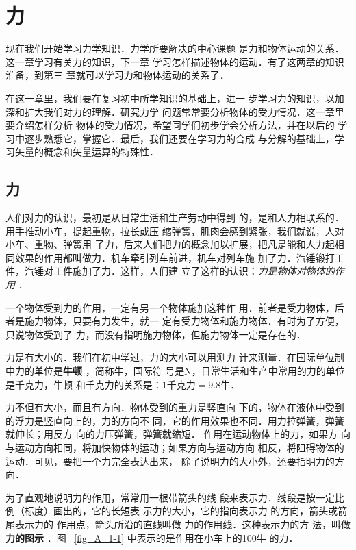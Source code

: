 \chapter{力}\label{chapter-force}

    现在我们开始学习力学知识．力学所要解决的中心课题
是力和物体运动的关系．这一章学习有关力的知识，下一章
学习怎样描述物体的运动．有了这两章的知识淮备，到第三
章就可以学习力和物体运动的关系了．

    在这一章里，我们要在复习初中所学知识的基础上，进一
步学习力的知识，以加深和扩大我们对力的理解．研究力学
问题常常要分析物体的受力情况．这一章里要介绍怎样分析
物体的受力情况，希望同学们初步学会分析方法，并在以后的
学习中逐步熟悉它，掌握它．最后，我们还要在学习力的合成
与分解的基础上，学习矢量的概念和矢量运算的特殊性．


\section{力} 
    人们对力的认识，最初是从日常生活和生产劳动中得到
的，是和人力相联系的．用手推动小车，提起重物，拉长或压
缩弹簧，肌肉会感到紧张，我们就说，人对小车、重物、弹簧用
了力，后来人们把力的概念加以扩展，把凡是能和人力起相
同效果的作用都叫做力．机车牵引列车前进，机车对列车施
加了力．汽锤锻打工件，汽锤对工件施加了力．这样，人们建
立了这样的认识：\textit{力是物体对物体的作用} ．

一个物体受到力的作用，一定有另一个物体施加这种作
用．前者是受力物体，后者是施力物体，只要有力发生，就一
定有受力物体和施力物体．有时为了方便，只说物体受到了
力，而没有指明施力物体，但施力物体一定是存在的．

    力是有大小的．我们在初中学过，力的大小可以用测力
计来测量．在国际单位制中力的单位是\textbf{牛顿} ，简称牛，国际符
号是N，日常生活和生产中常用的力的单位是千克力，牛顿
和千克力的关系是：1千克力$=9.8$牛．

    力不但有大小，而且有方向．物体受到的重力是竖直向
下的，物体在液体中受到的浮力是竖直向上的，力的方向不
同，它的作用效果也不同．用力拉弹簧，弹簧就伸长；用反方
向的力压弹簧，弹簧就缩短．
作用在运动物体上的力，如果方
向与运动方向相同，将加快物体的运动；如果方向与运动方向
相反，将阻碍物体的运动．可见，要把一个力完全表达出来，
除了说明力的大小外，还要指明力的方向．

为了直观地说明力的作用，常常用一根带箭头的线
段来表示力．线段是按一定比
例（标度）画出的，它的长短表
示力的大小，它的指向表示力
的方向，箭头或箭尾表示力的
作用点，箭头所沿的直线叫做
力的作用线．这种表示力的方
法，叫做\textbf{力的图示} ．图 ~\ref{fig_A_1-1}  中表示的是作用在小车上的100牛
的力．

